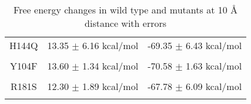 \documentclass{article}
\begin{document}
\begin{table}[ht]
\begin{tabular}{|c|c|c|}
    \hline
    H144Q & 13.35 $\pm$ 6.16 kcal/mol & -69.35 $\pm$ 6.43 kcal/mol \\ \\
    \hline
    Y104F & 13.60 $\pm$ 1.34 kcal/mol & -70.58 $\pm$ 1.63 kcal/mol \\ \\
    \hline
    R181S & 12.30 $\pm$ 1.89 kcal/mol & -67.78 $\pm$ 6.09 kcal/mol \\ \\
    \hline
    \end{tabular}
    \caption{Free energy changes in wild type and mutants at 10 Å distance with errors}
\end{table}
\end{document}
